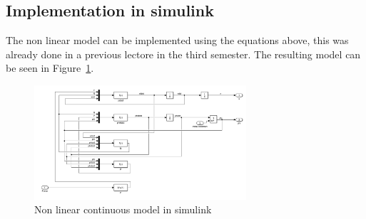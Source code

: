 \subsection{Implementation in simulink}
The non linear model can be implemented using the equations above, this was already done in a previous lectore in the third semester. The resulting model can be seen in Figure~\ref{fig:non_linear_continuous}.
\begin{figure}[H]
		\centering
		\includegraphics[width=0.7\textwidth]{figures/non_linear_continuous.png}
		\caption{Non linear continuous model in simulink}
		\label{fig:non_linear_continuous}
\end{figure}

\newpage
